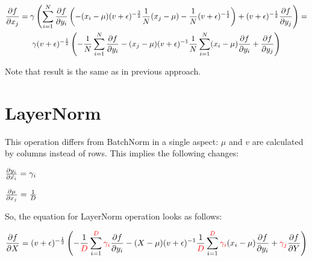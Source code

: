 \documentclass[12pt]{article}
\begin{document}
\begin{gather*}
\pdv{f}{x_j} = 
	\gamma 
	\left(
		\sum_{i=1}^{N} \pdv{f}{y_i} 
			\left( 
				- (x_i - \mu) (v + \epsilon)^{-\frac{3}{2}} \frac{1}{N} (x_j - \mu) - \frac{1}{N} (v + \epsilon)^{-\frac{1}{2}}
			\right) 
			+ (v + \epsilon)^{-\frac{1}{2}} \pdv{f}{y_j}
	\right) = \\
	\gamma (v + \epsilon)^{-\frac{1}{2}} 
	\left(	
		- \frac{1}{N} \sum_{i=1}^{N} \pdv{f}{y_i}
		- (x_j - \mu) (v + \epsilon)^{-1} \frac{1}{N} \sum_{i=1}^{N} (x_i - \mu) \pdv{f}{y_i} 
		+ \pdv{f}{y_j}
	\right)
\end{gather*}

Note that result is the same as in previous approach.

\section{LayerNorm}

This operation differs from BatchNorm in a single aspect: $\mu$ and $v$ are calculated by columns instead of rows. This implies the following changes:

$\pdv{y_i}{\hat{x_i}} = \gamma_i$

$\pdv{\mu}{x_j} = \frac{1}{D}$


So, the equation for LayerNorm operation looks as follows:

\[	
	\pdv{f}{X} = 
	(v + \epsilon)^{-\frac{1}{2}} 
	\left(	
		- \frac{1}{\begingroup\color{red} D \endgroup} 
		\sum_{i=1}^{\begingroup\color{red} D \endgroup} 
		\begingroup\color{red} \gamma_i \endgroup
		\pdv{f}{y_i}
		- (X - \mu) (v + \epsilon)^{-1} 
		\frac{1}{\begingroup\color{red} D \endgroup} 
		\sum_{i=1}^{\begingroup\color{red} D \endgroup} 
		\begingroup\color{red} \gamma_i \endgroup
		(x_i - \mu) \pdv{f}{y_i} 
		+ \begingroup\color{red} \gamma_j \endgroup \pdv{f}{Y}
	\right)
\]
\end{document}
